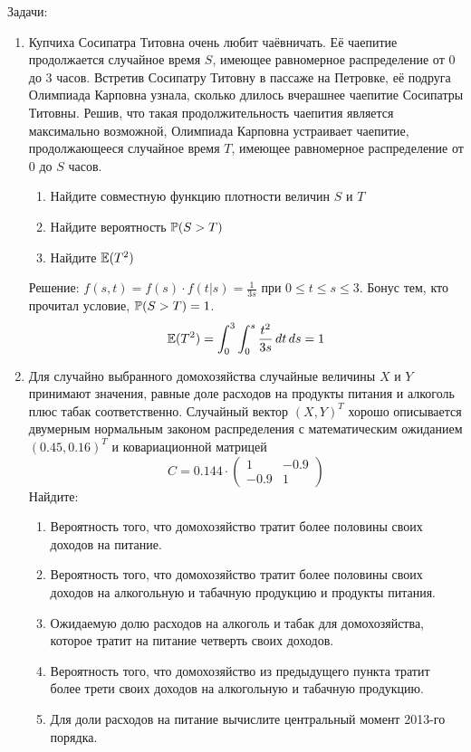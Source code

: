 \documentclass[12pt, a4paper]{article}\usepackage[]{graphicx}\usepackage[]{color}
\begin{document}
Задачи:
\begin{enumerate}
\item Купчиха Сосипатра Титовна очень любит чаёвничать. Её чаепитие продолжается случайное время $S$, имеющее равномерное распределение от 0 до 3 часов.  Встретив Сосипатру Титовну в пассаже на Петровке, её подруга Олимпиада Карповна узнала, сколько длилось вчерашнее чаепитие Сосипатры Титовны. Решив, что такая продолжительность чаепития является максимально возможной, Олимпиада Карповна устраивает чаепитие, продолжающееся случайное время $T$, имеющее равномерное распределение от 0 до $S$ часов.
\begin{enumerate}
\item Найдите совместную функцию плотности величин $S$ и $T$
\item Найдите вероятность $\P(S>T)$
\item Найдите $\E(T^2)$
\end{enumerate}

Решение: $f(s,t)=f(s)\cdot f(t|s)=\frac{1}{3s}$ при $0\leq t\leq s\leq 3$. Бонус тем, кто прочитал условие, $\P(S>T)=1$.
\[ \E(T^2)=\int_0^3\int_0^s \frac{t^2}{3s}\,dt\,ds=1 \]

\item  Для случайно выбранного домохозяйства случайные величины $X$ и $Y$ принимают значения, равные доле расходов на продукты питания и алкоголь плюс табак соответственно. Случайный вектор $(X,Y)^T$  хорошо описывается двумерным нормальным законом распределения с математическим ожиданием $(0.45, 0.16)^T$ и ковариационной матрицей
\[
C=0.144\cdot
\left(\begin{array}{cc}
1 & -0.9 \\
-0.9 & 1
\end{array}\right)
\]
Найдите:
\begin{enumerate}
\item Вероятность того, что домохозяйство тратит более половины своих доходов на питание.
\item Вероятность того, что домохозяйство тратит более половины своих доходов на алкогольную и табачную продукцию и продукты питания.
\item Ожидаемую долю расходов на алкоголь и табак для домохозяйства, которое тратит на питание четверть своих доходов.
\item Вероятность того, что домохозяйство из предыдущего пункта тратит более трети своих доходов на алкогольную и табачную продукцию.

\item Для доли расходов на питание вычислите центральный момент 2013-го порядка.


\end{enumerate}
\end{enumerate}
\end{document}

